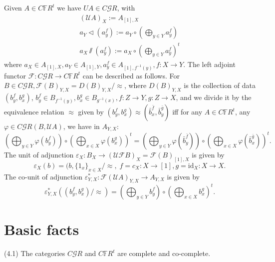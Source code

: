 \documentclass[leqno]{article}
\numberwithin{equation}{section}
\begin{document}
Given $A\in C\mathbb{F}R^t$ we have $UA\in C\mathcal{G}R$, with
\begin{equation}
\begin{gathered}
(\mathcal{U} A)_X:=A_{[1],X}\\
a_Y \lhd (a_y^f):=a_Y\circ \left( \bigoplus_{y\in Y} a_y^f \right) \\
a_X \sslash (a_y^f):= a_X\circ \left( \bigoplus_{y\in Y} a_y^f \right)^t
\end{gathered}
\end{equation}
where $a_X\in A_{[1],X},a_Y\in A_{[1],Y},a_y^f\in A_{[1],f^{-1}(y)},f:X\to Y$. The left adjoint functor $\mathcal F:C\mathcal{G}R\to C\mathbb{F}R^t$ can be described as follows. For $B\in C\mathcal{G}R,\mathcal{F}(B)_{Y,X}=D(B)_{Y,X}/\approx$, where $D(B)_{Y,X}$ is the collection of data $\left( b_y^f,b_x^g \right)$, $b_y^f\in B_{f^{-1}(y)},b_x^g\in B_{g^{-1}(x)},f:Z\to Y,g:Z\to X$, and we divide it by the equivalence relation $\approx$ given by $\left(b_y^f,b_x^g\right)\approx \left(\bar{b}_x^{\bar{f}},\bar{b}_y^{\bar{g}} \right)$ iff for any $A\in C\mathbb{F}R^t$, any $\varphi\in C\mathcal{G}R(B,\mathcal{U}A)$, we have in $A_{Y,X}$:
\begin{equation}
\left(\bigoplus_{y\in Y}\varphi(b_y^f)\right)\circ \left(\bigoplus_{x\in X}\varphi(b_x^g)\right)^t= \left(\bigoplus_{y\in Y}\varphi(\bar{b}_y^{\bar{f}})\right)\circ \left(\bigoplus_{x\in X}\varphi(\bar{b}_x^{\bar{g}})\right)^t.
\end{equation}
The unit of adjunction $\varepsilon_X:B_X\to (\mathcal{UF}B)_X=\mathcal{F}(B)_{[1],X}$ is given by
\begin{equation}
\varepsilon_X(b)=(b, \{1_x \}_{x\in X}/\approx,\;f=c_X:X\to[1],g=\mathrm{id}_X:X\to X.
\end{equation}
The co-unit of adjunction $\varepsilon ^\ast_{Y,X}:\mathcal{F}(\mathcal{U}A)_{Y,X}\to A_{Y,X}$ is given by
\begin{equation}
\varepsilon^\ast_{Y,X}\left ( (b_y^f,b_x^g)/\approx \right)=\left(\bigoplus_{y\in Y}b_y^f\right)\circ \left(\bigoplus_{x\in X}b_x^g\right)^t.
\end{equation}
\section{Basic facts}

\noindent (4.1) \quad The categories $C{\mathcal G} R$ and $C{\mathbb F} R^t$ are complete and co-complete. 

\bigskip
\end{document}
